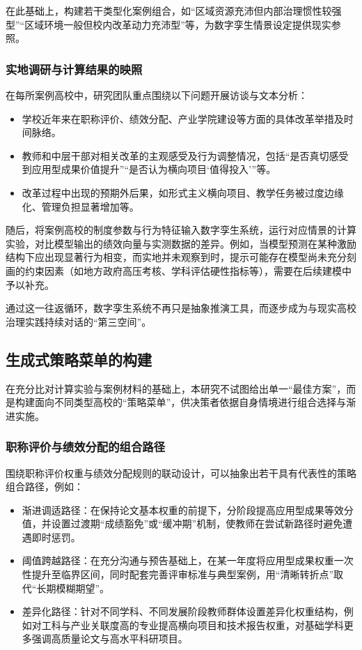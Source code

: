 \documentclass[UTF8, zihao=-4, fontset=mac]{ctexart}
\begin{document}
在此基础上，构建若干类型化案例组合，如“区域资源充沛但内部治理惯性较强型”“区域环境一般但校内改革动力充沛型”等，为数字孪生情景设定提供现实参照。

\subsubsection{实地调研与计算结果的映照}

在每所案例高校中，研究团队重点围绕以下问题开展访谈与文本分析：

\begin{itemize}
    \item 学校近年来在职称评价、绩效分配、产业学院建设等方面的具体改革举措及时间脉络。
    \item 教师和中层干部对相关改革的主观感受及行为调整情况，包括“是否真切感受到应用型成果价值提升”“是否认为横向项目‘值得投入’”等。
    \item 改革过程中出现的预期外后果，如形式主义横向项目、教学任务被过度边缘化、管理负担显著增加等。
\end{itemize}

随后，将案例高校的制度参数与行为特征输入数字孪生系统，运行对应情景的计算实验，对比模型输出的绩效向量与实测数据的差异。例如，当模型预测在某种激励结构下应出现显著行为相变，而实地并未观察到时，提示可能存在模型尚未充分刻画的约束因素（如地方政府高压考核、学科评估硬性指标等），需要在后续建模中予以补充。

通过这一往返循环，数字孪生系统不再只是抽象推演工具，而逐步成为与现实高校治理实践持续对话的“第三空间”。

\subsection{生成式策略菜单的构建}

在充分比对计算实验与案例材料的基础上，本研究不试图给出单一“最佳方案”，而是构建面向不同类型高校的“策略菜单”，供决策者依据自身情境进行组合选择与渐进实施。

\subsubsection{职称评价与绩效分配的组合路径}

围绕职称评价权重与绩效分配规则的联动设计，可以抽象出若干具有代表性的策略组合路径，例如：

\begin{itemize}
    \item 渐进调适路径：在保持论文基本权重的前提下，分阶段提高应用型成果等效分值，并设置过渡期“成绩豁免”或“缓冲期”机制，使教师在尝试新路径时避免遭遇即时惩罚。
    \item 阈值跨越路径：在充分沟通与预告基础上，在某一年度将应用型成果权重一次性提升至临界区间，同时配套完善评审标准与典型案例，用“清晰转折点”取代“长期模糊期望”。
    \item 差异化路径：针对不同学科、不同发展阶段教师群体设置差异化权重结构，例如对工科与产业关联度高的专业提高横向项目和技术报告权重，对基础学科更多强调高质量论文与高水平科研项目。
\end{itemize}
\end{document}
